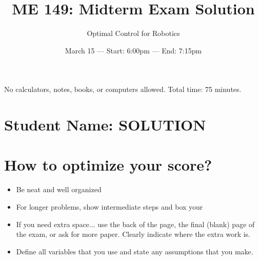 


\newcommand{\scoreMark}[0]{$\rule{1.5cm}{0.15mm}$ / $\rule{1.5cm}{0.15mm}$}

\title{ME 149:  Midterm Exam Solution}
\date{March 15  ---  Start: 6:00pm  ---  End: 7:15pm}
\author{Optimal Control for Robotics}

\maketitle

\begin{abstract*}
No calculators, notes, books, or computers allowed. Total time:  75 minutes.
\end{abstract*}

\vspace{1em}

\section*{Student Name:    SOLUTION}

\vspace{1em}

\section*{How to optimize your score?}

\begin{itemize}  \setlength\itemsep{0.1em} \setlength\itemindent{18pt}
  \item Be neat and well organized
  \item For longer problems, show intermediate steps and box your
  \item If you need extra space...
        use the back of the page,
        the final (blank) page of the exam,
        or ask for more paper.
        Clearly indicate where the extra work is.
  \item Define all variables that you use and state any assumptions that you make.
\end{itemize}


